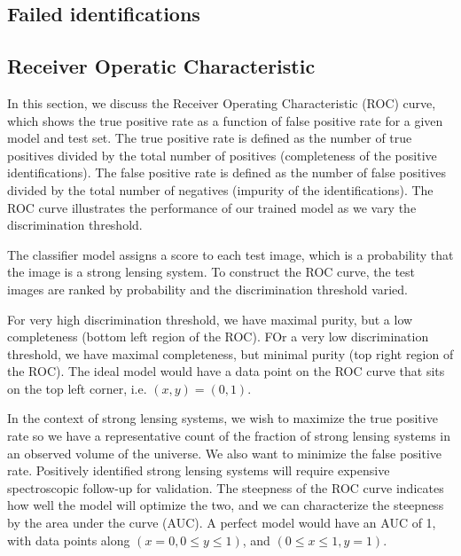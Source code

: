 \documentclass{emulateapj}
\begin{document}


\subsection{Failed identifications}

\subsection{Receiver Operatic Characteristic}

In this section, we discuss the Receiver Operating Characteristic
(ROC) curve, which shows the true positive rate as a function of false
positive rate for a given model and test set.  The true positive rate
is defined as the number of true positives divided by the total number
of positives (completeness of the positive identifications).  The
false positive rate is defined as the number of false positives
divided by the total number of negatives (impurity of the
identifications).  The ROC curve illustrates the performance of our
trained model as we vary the discrimination threshold.

The classifier model assigns a score to each test image, which is a
probability that the image is a strong lensing system.  To construct
the ROC curve, the test images are ranked by probability and the
discrimination threshold varied.  

For very high discrimination threshold, we have maximal purity, but a
low completeness (bottom left region of the ROC).  FOr a very low
discrimination threshold, we have maximal completeness, but minimal
purity (top right region of the ROC).  The ideal model would have a
data point on the ROC curve that sits on the top left corner,
i.e. $(x, y) = (0, 1)$.

In the context of strong lensing systems, we wish to maximize the true
positive rate so we have a representative count of the fraction of
strong lensing systems in an observed volume of the universe.  We also
want to minimize the false positive rate.  Positively identified
strong lensing systems will require expensive spectroscopic follow-up
for validation.  The steepness of the ROC curve indicates how well the
model will optimize the two, and we can characterize the steepness by
the area under the curve (AUC).  A perfect model would have an AUC of
1, with data points along $(x=0, 0\leq y\leq1)$, and $(0\leq x\leq 1,
y=1)$.
\end{document}
